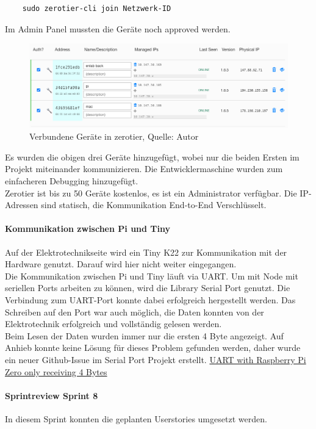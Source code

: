 \begin{verbatim}
	sudo zerotier-cli join Netzwerk-ID
\end{verbatim}
Im Admin Panel mussten die Geräte noch approved werden.
\begin{figure}[H]
	\centering
	\includegraphics[width=1\textwidth]{images/zerotier.PNG}
	\caption[Verbundene Geräte in zerotier]{Verbundene Geräte in zerotier, Quelle: Autor}
	\label{img: zerotier}
\end{figure} 
Es wurden die obigen drei Geräte hinzugefügt, wobei nur die beiden Ersten im Projekt miteinander kommunizieren. Die Entwicklermaschine wurden zum einfacheren Debugging hinzugefügt. \\
Zerotier ist bis zu 50 Geräte kostenlos, es ist ein Administrator verfügbar. Die IP-Adressen sind statisch, die Kommunikation End-to-End Verschlüsselt.

\paragraph{Kommunikation zwischen Pi und Tiny}\label{kommTiny}
Auf der Elektrotechnikseite wird ein Tiny K22 zur Kommunikation mit der Hardware genutzt. Darauf wird hier nicht weiter eingegangen. \\
Die Kommunikation zwischen Pi und Tiny läuft via \ac{UART}. Um mit Node mit seriellen Ports arbeiten zu können, wird die Library Serial Port genutzt. 
Die Verbindung zum \ac{UART}-Port konnte dabei erfolgreich hergestellt werden. Das Schreiben auf den Port war auch möglich, die Daten konnten von der Elektrotechnik erfolgreich und vollständig gelesen werden. \\
Beim Lesen der Daten wurden immer nur die ersten 4 Byte angezeigt. Auf Anhieb konnte keine Lösung für dieses Problem gefunden werden, daher wurde ein neuer \gls{Github}-Issue im Serial Port Projekt erstellt. 
\href{https://github.com/serialport/node-serialport/issues/2252}{UART with Raspberry Pi Zero only receiving 4 Bytes}

\paragraph{Sprintreview Sprint 8}
In diesem Sprint konnten die geplanten Userstories umgesetzt werden. 

